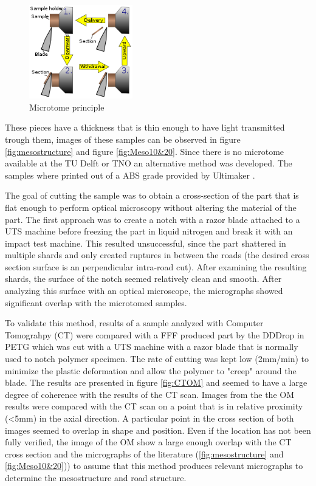 \begin{figure}[H]
    \centering
    \includegraphics[width=0.40\textwidth]{chapter_4_RVE_Definition/figures/Microtomeprinciple.png}
    \caption{Microtome principle}
    \label{fig:Microtomeprinciple}
\end{figure}

These pieces have a thickness that is thin enough to have light transmitted trough them, images of these samples can be observed in figure \ref{fig:mesostructure} and figure \ref{fig:Meso10&20}. Since there is no microtome available at the TU Delft or TNO an alternative method was developed. The samples where printed out of a ABS grade provided by Ultimaker \cite{Ultimaker2018TechnicalABS}. 

The goal of cutting the sample was to obtain a cross-section of the part that is flat enough to perform optical microscopy without altering the material of the part. The first approach was to create a notch with a razor blade attached to a UTS machine before freezing the part in liquid nitrogen and break it with an impact test machine. This resulted unsuccessful, since the part shattered in multiple shards and only created ruptures in between the roads (the desired cross section surface is an perpendicular intra-road cut). After examining the resulting shards, the surface of the notch seemed relatively clean and smooth. After analyzing this surface with an optical microscope, the micrographs showed significant overlap with the microtomed samples. 

To validate this method, results of a sample analyzed with Computer Tomograhpy (CT) were compared with a FFF produced part by the DDDrop \cite{Veen2019EnhancingTemperature} in PETG which was cut with a UTS machine with a razor blade that is normally used to notch polymer specimen. The rate of cutting was kept low (2mm/min) to minimize the plastic deformation and allow the polymer to "creep" around the blade. The results are presented in figure \ref{fig:CTOM} and seemed to have a large degree of coherence with the results of the CT scan. Images from the the OM results were compared with the CT scan on a point that is in relative proximity (<5mm) in the axial direction. A particular point in the cross section of both images seemed to overlap in shape and position. Even if the location has not been fully verified, the image of the OM show a large enough overlap with the CT cross section and the micrographs of the literature (\ref{fig:mesostructure} and \ref{fig:Meso10&20})) to assume that this method produces relevant micrographs to determine the mesostructure and road structure.  

